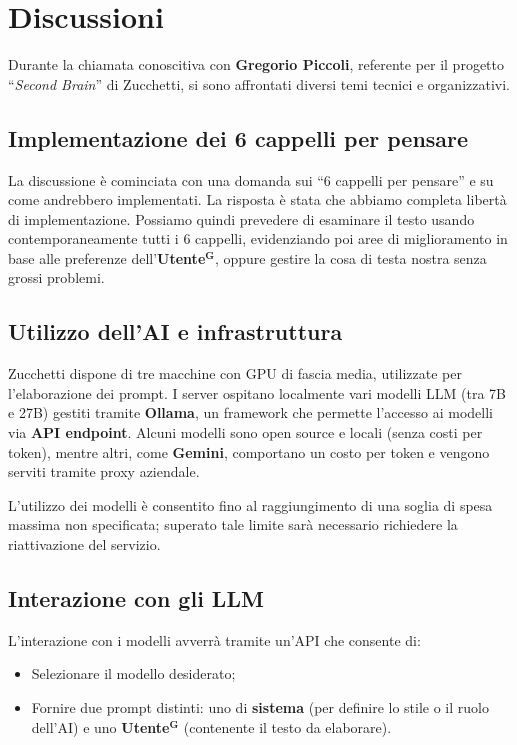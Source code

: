 \documentclass[a4paper,12pt]{article}
\newcommand{\term}[1]{\textbf{#1}$^\mathbf{G}$}
\begin{document}
\section{Discussioni}

Durante la chiamata conoscitiva con \textbf{Gregorio Piccoli}, referente per il progetto “\textit{Second Brain}” di Zucchetti, si sono affrontati diversi temi tecnici e organizzativi.

\subsection{Implementazione dei 6 cappelli per pensare}
La discussione è cominciata con una domanda sui “6 cappelli per pensare” e su come andrebbero implementati. La risposta è stata che abbiamo completa libertà di implementazione. Possiamo quindi prevedere di esaminare il testo usando contemporaneamente tutti i 6 cappelli, evidenziando poi aree di miglioramento in base alle preferenze dell’\term{Utente}, oppure gestire la cosa di testa nostra senza grossi problemi.

\subsection{Utilizzo dell'AI e infrastruttura}
Zucchetti dispone di tre macchine con GPU di fascia media, utilizzate per l’elaborazione dei prompt.
I server ospitano localmente vari modelli LLM (tra 7B e 27B) gestiti tramite \textbf{Ollama}, un framework che permette l’accesso ai modelli via \textbf{API endpoint}.
Alcuni modelli sono open source e locali (senza costi per token), mentre altri, come \textbf{Gemini}, comportano un costo per token e vengono serviti tramite proxy aziendale.

L’utilizzo dei modelli è consentito fino al raggiungimento di una soglia di spesa massima non specificata; superato tale limite sarà necessario richiedere la riattivazione del servizio.

\subsection{Interazione con gli LLM}
L’interazione con i modelli avverrà tramite un’API che consente di:
\begin{itemize}
    \item Selezionare il modello desiderato;
    \item Fornire due prompt distinti: uno di \textbf{sistema} (per definire lo stile o il ruolo dell’AI) e uno \textbf{\term{Utente}} (contenente il testo da elaborare).
\end{itemize}
\end{document}
